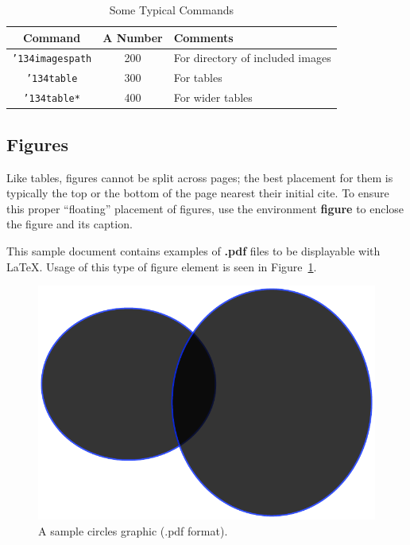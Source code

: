 \documentclass[article]{stucosrec}
\begin{document}
	\begin{table}
		\centering
		\caption{Some Typical Commands}
		\label{tab:table2}
		\begin{tabular}{|c|c|l|} \hline
			Command&A Number&Comments\\ \hline
			\texttt{{\char'134}imagespath} & 200 & For directory of included images \\ \hline
			\texttt{{\char'134}table} & 300 & For tables\\ \hline
			\texttt{{\char'134}table*} & 400& For wider tables\\ \hline
		\end{tabular}
	\end{table}
	
	\subsection{Figures}
	
	Like tables, figures cannot be split across pages; the
best placement for them
is typically the top or the bottom of the page nearest
their initial cite.
	To ensure this proper ``floating'' placement
of figures, use the environment
\textbf{figure} to enclose the figure and its caption.
	
	This sample document contains examples of \textbf{.pdf} files to be displayable with \LaTeX.
	Usage of this type of figure element is seen in Figure~\ref{fig:circles}.
	
	\begin{figure}
		\centering
		\includegraphics[scale=0.5]{circles.pdf}
		\caption{A sample circles graphic (.pdf format).}
		\label{fig:circles}
	\end{figure}
\end{document}
